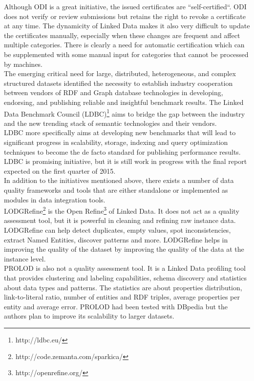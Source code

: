 \documentclass[onecolumn, crcready]{iosart2c}
\begin{document}
Although ODI is a great initiative, the issued certificates are “self-certified“. ODI does not verify or review submissions but retains the right to revoke a certificate at any time. The dynamicity of Linked Data  makes it also very difficult to update the certificates manually, especially when these changes are frequent and affect multiple categories. There is clearly a need for automatic certification which can be supplemented with some manual input for categories that cannot be processed by machines.\\


The emerging critical need for large, distributed, heterogeneous, and complex structured datasets identified the necessity to establish industry cooperation between vendors of RDF and Graph database technologies in developing, endorsing, and publishing reliable and insightful benchmark results. The Linked Data Benchmark Council (LDBC)\footnote{http://ldbc.eu/} aims to bridge the gap between the industry and the new trending stack of semantic technologies and their vendors. \\ LDBC more specifically aims at developing new benchmarks that will lead to significant progress in scalability, storage, indexing and query optimization techniques to become the de facto standard for publishing performance results. LDBC is promising initiative, but it is still work in progress with the final report expected on the first quarter of 2015.\\

In addition to the initiatives mentioned above, there exists a number of data quality frameworks and tools that are either standalone or implemented as modules in data integration tools. \\

LODGRefine\footnote{http://code.zemanta.com/sparkica/} is the Open Refine\footnote{http://openrefine.org/} of Linked Data. It does not act as a quality assessment tool, but it is powerful in cleaning and refining raw instance data. LODGRefine can help detect duplicates, empty values, spot inconsistencies, extract Named Entities, discover patterns and more. LODGRefine helps in improving the quality of the dataset by improving the quality of the data at the instance level.\\


PROLOD \cite{Bohm2010} is also not a quality assessment tool. It is a Linked Data profiling tool that provides clustering and labeling capabilities, schema discovery and statistics about data types and patterns. The statistics are about properties distribution, link-to-literal ratio, number of entities and RDF triples, average properties per entity and average error. PROLOD had been tested with DBpedia but the authors plan to improve its scalability to larger datasets.\\
\end{document}
